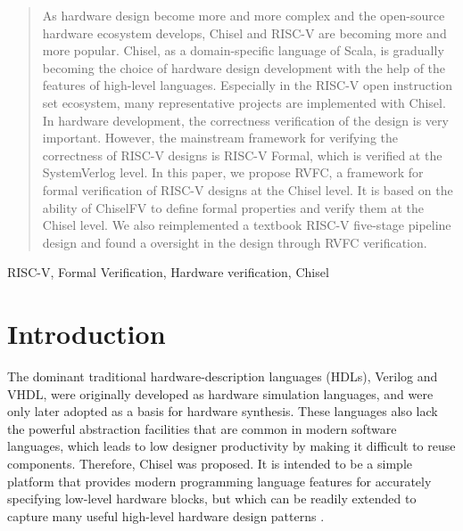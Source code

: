 \documentclass[conference]{IEEEtran}
\theoremstyle{definition}
\begin{document}
\begin{abstract}
    As hardware design become more and more complex and the open-source hardware ecosystem develops, Chisel and RISC-V are becoming more and more popular.
    Chisel, as a domain-specific language of Scala, is gradually becoming the choice of hardware design development with the help of the features of high-level languages.
    Especially in the RISC-V open instruction set ecosystem, many representative projects are implemented with Chisel.
    In hardware development, the correctness verification of the design is very important.
    However, the mainstream framework for verifying the correctness of RISC-V designs is RISC-V Formal, which is verified at the SystemVerlog level.
    In this paper, we propose RVFC, a framework for formal verification of RISC-V designs at the Chisel level.
    It is based on the ability of ChiselFV to define formal properties and verify them at the Chisel level.
    We also reimplemented a textbook RISC-V five-stage pipeline design and found a oversight in the design through RVFC verification.

\end{abstract}

\begin{IEEEkeywords}
RISC-V, Formal Verification, Hardware verification, Chisel
\end{IEEEkeywords}

\section{Introduction}
The dominant traditional hardware-description languages (HDLs), Verilog and VHDL, were originally developed as hardware simulation languages, and were only later adopted as a basis for hardware synthesis. 
These languages also lack the powerful abstraction facilities that are common in modern software languages, which leads to low designer productivity by making it difficult to reuse components.
Therefore, Chisel was proposed.
It is intended to be a simple platform that provides modern programming language features for accurately specifying low-level hardware blocks, but which can be readily extended to capture many useful high-level hardware design patterns \cite{bachrach2012chisel}.
\end{document}
